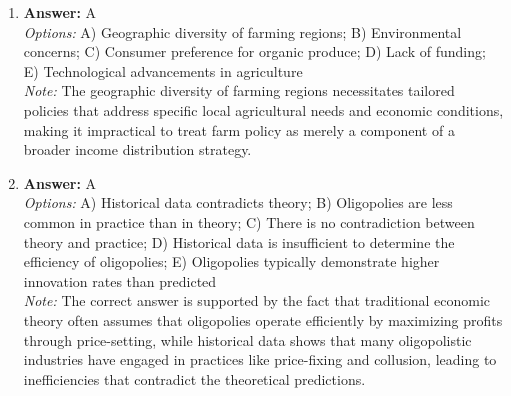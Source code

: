 \documentclass[12pt]{article}
\begin{document}
\begin{enumerate}[label=\arabic*.]
\item \textbf{Answer:} A
\\ \textit{Options:} A) Geographic diversity of farming regions; B) Environmental concerns; C) Consumer preference for organic produce; D) Lack of funding; E) Technological advancements in agriculture
\\ \textit{Note:} The geographic diversity of farming regions necessitates tailored policies that address specific local agricultural needs and economic conditions, making it impractical to treat farm policy as merely a component of a broader income distribution strategy.
\item \textbf{Answer:} A
\\ \textit{Options:} A) Historical data contradicts theory; B) Oligopolies are less common in practice than in theory; C) There is no contradiction between theory and practice; D) Historical data is insufficient to determine the efficiency of oligopolies; E) Oligopolies typically demonstrate higher innovation rates than predicted
\\ \textit{Note:} The correct answer is supported by the fact that traditional economic theory often assumes that oligopolies operate efficiently by maximizing profits through price-setting, while historical data shows that many oligopolistic industries have engaged in practices like price-fixing and collusion, leading to inefficiencies that contradict the theoretical predictions.
\end{enumerate}
\end{document}
